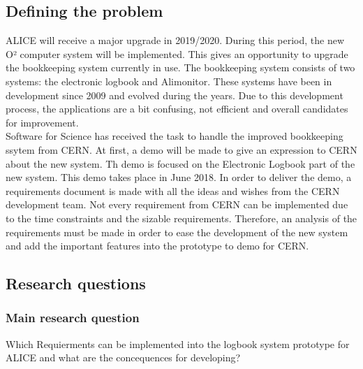 \documentclass[paper=a4, fontsize=11pt,twoside]{scrartcl}	%
\begin{document}
\subsection{Defining the problem}
ALICE will receive a major upgrade in 2019/2020. During this period, the new O² computer system will be implemented. This gives an opportunity to upgrade the bookkeeping system currently in use. The bookkeeping system consists of two systems: the electronic logbook and Alimonitor. These systems have been in development since 2009 and evolved during the years. Due to this development process, the applications are a bit confusing, not efficient and overall candidates for improvement. \\
Software for Science has received the task to handle the improved bookkeeping ssytem from CERN. At first, a demo will be made to give an expression to CERN about the new system. Th demo is focused on the Electronic Logbook part of the new system. This demo takes place in June 2018. In order to deliver the demo, a requirements document is made with all the ideas and wishes from the CERN development team. Not every requirement from CERN can be implemented due to the time constraints and the sizable requirements. Therefore, an analysis of the requirements must be made in order to ease the development of the new system and add the important features into the prototype to demo for CERN.

\subsection{Research questions}

\subsubsection{Main research question}

Which Requierments can be implemented into the logbook system prototype for ALICE and what are the concequences for developing?
% 
%
%
% 
% 
% 
\end{document}
